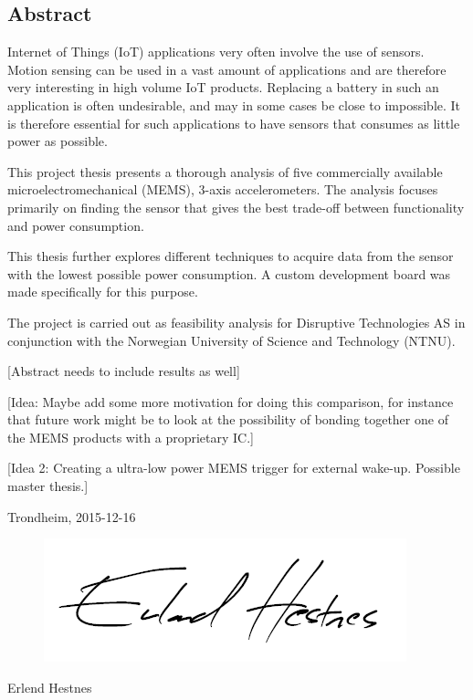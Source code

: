 \begin{center}
\section*{Abstract}
\end{center}

Internet of Things (IoT) applications very often involve the use of sensors. Motion sensing can be used in a vast amount of applications and are therefore very interesting in high volume IoT products. Replacing a battery in such an application is often undesirable, and may in some cases be close to impossible. It is therefore essential for such applications to have sensors that consumes as little power as possible. 

This project thesis presents a thorough analysis of five commercially available microelectromechanical (MEMS), 3-axis accelerometers. The analysis focuses primarily on finding the sensor that gives the best trade-off between functionality and power consumption. 

This thesis further explores different techniques to acquire data from the sensor with the lowest possible power consumption. A custom development board was made specifically for this purpose.

The project is carried out as feasibility analysis for Disruptive Technologies AS in conjunction with the Norwegian University of Science and Technology (NTNU).

[Abstract needs to include results as well]

[Idea: Maybe add some more motivation for doing this comparison, for instance that future work might be to look at the possibility of bonding together one of the MEMS products with a proprietary IC.]

[Idea 2: Creating a ultra-low power MEMS trigger for external wake-up. Possible master thesis.]

\begin{center}
Trondheim, 2015-12-16\\[1pc]
\begin{figure}[h]
\centering
\includegraphics[scale=0.5]{fig/underskrift.png}
\label{fig:underskrift}
\end{figure}
Erlend Hestnes
\end{center}
